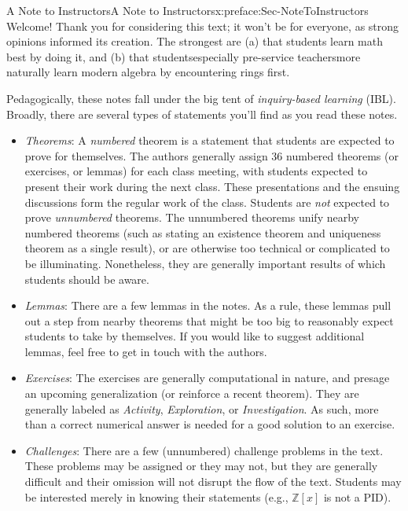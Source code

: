\documentclass[oneside,10pt,]{book}
\numberwithin{equation}{section}
\def\Z{{\mathbb Z}}
\begin{document}
%
%
\typeout{************************************************}
\typeout{************************************************}
%
\begin{preface}{A Note to Instructors}{}{A Note to Instructors}{}{}{x:preface:Sec-NoteToInstructors}
Welcome! Thank you for considering this text; it won't be for everyone, as strong opinions informed its creation. The strongest are (a) that students learn math best by doing it, and (b) that students\textendash{}especially pre-service teachers\textendash{}more naturally learn modern algebra by encountering rings first.%
\par
Pedagogically, these notes fall under the big tent of \emph{inquiry-based learning} (IBL). Broadly, there are several types of statements you'll find as you read these notes.%
\begin{itemize}[label=\textbullet]
\item{}\emph{Theorems}: A \emph{numbered} theorem is a statement that students are expected to prove for themselves. The authors generally assign 3\textendash{}6 numbered theorems (or exercises, or lemmas) for each class meeting, with students expected to present their work during the next class. These presentations and the ensuing discussions form the regular work of the class. Students are \emph{not} expected to prove \emph{unnumbered} theorems. The unnumbered theorems unify nearby numbered theorems (such as stating an existence theorem and uniqueness theorem as a single result), or are otherwise too technical or complicated to be illuminating. Nonetheless, they are generally important results of which students should be aware.%
\item{}\emph{Lemmas}: There are a few lemmas in the notes. As a rule, these lemmas pull out a step from nearby theorems that might be too big to reasonably expect students to take by themselves. If you would like to suggest additional lemmas, feel free to get in touch with the authors.%
\item{}\emph{Exercises}: The exercises are generally computational in nature, and presage an upcoming generalization (or reinforce a recent theorem). They are generally labeled as \emph{Activity}, \emph{Exploration}, or \emph{Investigation}. As such, more than a correct numerical answer is needed for a good solution to an exercise.%
\item{}\emph{Challenges}: There are a few (unnumbered) challenge problems in the text. These problems may be assigned or they may not, but they are generally difficult and their omission will not disrupt the flow of the text. Students may be interested merely in knowing their statements (e.g., \(\Z[x]\) is not a PID).%

\end{itemize}
\end{preface}
\end{document}
